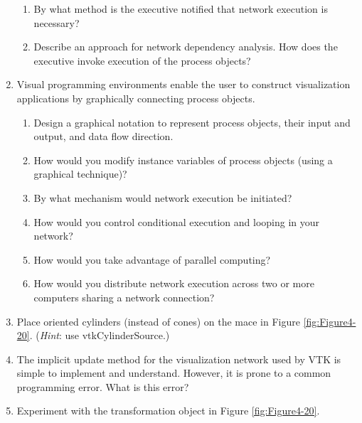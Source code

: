 \begin{enumerate}
\begin{enumerate}
    \item By what method is the executive notified that network execution is necessary?

    \item Describe an approach for network dependency analysis. How does the executive invoke execution of the process objects?

\end{enumerate}

\item Visual programming environments enable the user to construct visualization applications by graphically connecting process objects.

\begin{enumerate}

    \item Design a graphical notation to represent process objects, their input and output, and data flow direction.

    \item How would you modify instance variables of process objects (using a graphical technique)?

    \item By what mechanism would network execution be initiated?

    \item How would you control conditional execution and looping in your network?

    \item How would you take advantage of parallel computing?

    \item How would you distribute network execution across two or more computers sharing a network connection?

\end{enumerate}

\item Place oriented cylinders (instead of cones) on the mace in Figure \ref{fig:Figure4-20}. (\emph{Hint}: use vtkCylinderSource.)

\item The implicit update method for the visualization network used by VTK is simple to implement and understand. However, it is prone to a common programming error. What is this error?

\item Experiment with the transformation object in Figure \ref{fig:Figure4-20}.

\begin{enumerate}


\end{enumerate}
\end{enumerate}
